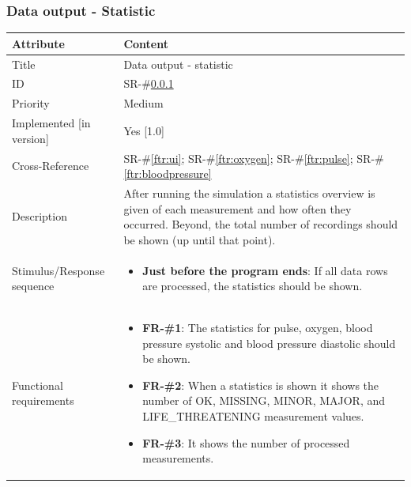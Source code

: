 \documentclass[a4paper]{article}
\begin{document}
\subsubsection{Data output - Statistic}
\label{ftr:statistic}
\renewcommand*{\arraystretch}{1.4}
\begin{longtable}[l]{ | >{\columncolor{vu-grey-50}}m{110pt} | m{300pt} | }

    \hline
    \rowcolor{vu-blue}
    \textcolor{vu-white}{\textbf{Attribute}} & \textcolor{vu-white}{\textbf{Content}}
    \\ \hline
    
    Title &
    Data output - statistic
    \\ \hline
    
    ID &
    SR-\#\ref{ftr:statistic}
    \\ \hline
    
    Priority &
    Medium
    \\ \hline
    
    Implemented [in version] &
    Yes [1.0]
    \\ \hline
    
    Cross-Reference &
    SR-\#\ref{ftr:ui}; SR-\#\ref{ftr:oxygen}; SR-\#\ref{ftr:pulse}; SR-\#\ref{ftr:bloodpressure}
    \\ \hline
    
    Description &
        After running the simulation a statistics overview is given of each measurement and how often they occurred. Beyond, the total number of recordings should be shown (up until that point).
    \\ \hline
    
    Stimulus/Response sequence &
    \begin{itemize}
        \item \textbf{Just before the program ends}: If all data rows are processed, the statistics should be shown.
    \end{itemize}
    \\ \hline
    
    Functional requirements &
    \begin{itemize}
        \item \textbf{FR-\#1}: The statistics for pulse, oxygen, blood pressure systolic and blood pressure diastolic should be shown.
        \item \textbf{FR-\#2}: When a statistics is shown it shows the number of OK, MISSING, MINOR, MAJOR, and LIFE\_THREATENING measurement values.
        \item \textbf{FR-\#3}: It shows the number of processed measurements.
    \end{itemize}
    \\ \hline
    
\end{longtable}
\end{document}
